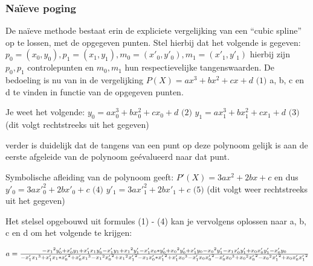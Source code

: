 \documentclass[a4paper,11pt,oneside, titlepage]{article}
\begin{document}
\subsubsection{Na\"ieve poging}
De na\"ieve methode bestaat erin de expliciete vergelijking van een ``cubic spline''
op te lossen, met de opgegeven punten.\newline
Stel hierbij dat het volgende is gegeven:\newline
$p_0 = (x_0,y_0), p_1 = (x_1,y_1), m_0 = (x'_0, y'_0), m_1 = (x'_1, y'_1)$\newline
hierbij zijn $p_0,p_1$ controlepunten en $m_0, m_1$ hun respectievelijke tangenswaarden.\newline
\newline
De bedoeling is nu van in de vergelijking\newline
$P(X) = ax^3 + bx^2 + cx + d \textrm{   (1)}$\newline
a, b, c en d te vinden in functie van de opgegeven punten.\newline

Je weet het volgende:
$y_0 = ax_0^3 + bx_0^2 + cx_0 + d \textrm{   (2)}$\newline
$y_1 = ax_1^3 + bx_1^2 + cx_1 + d \textrm{   (3)}$\newline
(dit volgt rechtstreeks uit het gegeven)\newline

verder is duidelijk dat de tangens van een punt op deze polynoom gelijk is aan de 
eerste afgeleide van de polynoom ge\'evalueerd naar dat punt.\newline

Symbolische afleiding van de polynoom geeft:
$P'(X) = 3ax^2 + 2bx + c$
en dus
$y'_0 = 3a{x'}_0^2 + 2bx'_0 + c \textrm{   (4)}$\newline
$y'_1 = 3a{x'}_1^2 + 2bx'_1 + c \textrm{   (5)}$\newline
(dit volgt weer rechtstreeks uit het gegeven)\newline

Het stelsel opgebouwd uit formules (1) - (4) kan je vervolgens oplossen naar a, b, c en d
om het volgende te krijgen:\newline

$a = {{{-{x_1}^2y'_0+x'_0y_1+x'_1x_1y'_0-x'_1y_1+{x_1}^2y'_1-x'_1x_0*y'_0+{x_0}^2y'_0+x'_1y_0-{x_0}^2y'_1-x_1x'_0y'_1+x_0x'_0y'_1-x'_0y_0}}\over{-x'_1{x_1}^3+x'_1x_1*{x'_0}^2+x'_0{x_1}^3-{x_1}^2{x'_0}^2+{x_1}^2{x'_1}^2-x_1x'_0*{x'_1}^2+x'_1{x_0}^3-x'_1x_0{x'_0}^2-x'_0{x_0}^3+{x_0}^2{x'_0}^2-{x_0}^2{x'_1}^2+x_0x'_0{x'_1}^2}}$\newline \newline
\end{document}
